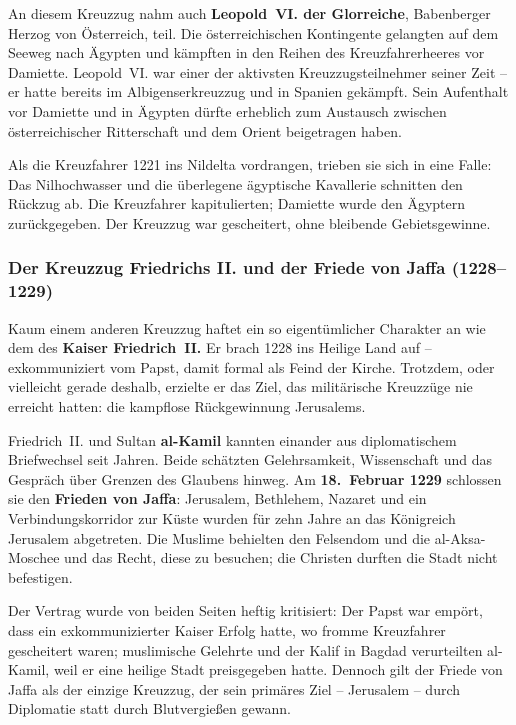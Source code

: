 An diesem Kreuzzug nahm auch \textbf{Leopold~VI. der Glorreiche}, Babenberger Herzog von Österreich, teil. Die österreichischen Kontingente gelangten auf dem Seeweg nach Ägypten und kämpften in den Reihen des Kreuzfahrerheeres vor Damiette. Leopold~VI. war einer der aktivsten Kreuzzugsteilnehmer seiner Zeit -- er hatte bereits im Albigenserkreuzzug und in Spanien gekämpft. Sein Aufenthalt vor Damiette und in Ägypten dürfte erheblich zum Austausch zwischen österreichischer Ritterschaft und dem Orient beigetragen haben. \cite{lechner_babenberger}

Als die Kreuzfahrer 1221 ins Nildelta vordrangen, trieben sie sich in eine Falle: Das Nilhochwasser und die überlegene ägyptische Kavallerie schnitten den Rückzug ab. Die Kreuzfahrer kapitulierten; Damiette wurde den Ägyptern zurückgegeben. Der Kreuzzug war gescheitert, ohne bleibende Gebietsgewinne.

\subsubsection{Der Kreuzzug Friedrichs II. und der Friede von Jaffa (1228--1229)}\label{kreuzzugs_friedrichs_II}

Kaum einem anderen Kreuzzug haftet ein so eigentümlicher Charakter an wie dem des \textbf{Kaiser Friedrich~II.} Er brach 1228 ins Heilige Land auf -- exkommuniziert vom Papst, damit formal als Feind der Kirche. Trotzdem, oder vielleicht gerade deshalb, erzielte er das Ziel, das militärische Kreuzzüge nie erreicht hatten: die kampflose Rückgewinnung Jerusalems.

Friedrich~II. und Sultan \textbf{al-Kamil} kannten einander aus diplomatischem Briefwechsel seit Jahren. Beide schätzten Gelehrsamkeit, Wissenschaft und das Gespräch über Grenzen des Glaubens hinweg. Am \textbf{18.~Februar 1229} schlossen sie den \textbf{Frieden von Jaffa}: Jerusalem, Bethlehem, Nazaret und ein Verbindungskorridor zur Küste wurden für zehn Jahre an das Königreich Jerusalem abgetreten. Die Muslime behielten den Felsendom und die al-Aksa-Moschee und das Recht, diese zu besuchen; die Christen durften die Stadt nicht befestigen.

Der Vertrag wurde von beiden Seiten heftig kritisiert: Der Papst war empört, dass ein exkommunizierter Kaiser Erfolg hatte, wo fromme Kreuzfahrer gescheitert waren; muslimische Gelehrte und der Kalif in Bagdad verurteilten al-Kamil, weil er eine heilige Stadt preisgegeben hatte. Dennoch gilt der Friede von Jaffa als der einzige Kreuzzug, der sein primäres Ziel -- Jerusalem -- durch Diplomatie statt durch Blutvergießen gewann.

